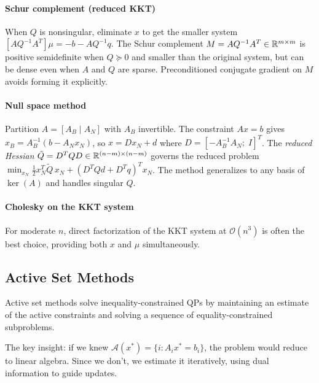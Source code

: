\paragraph{Schur complement (reduced KKT)}

When $Q$ is nonsingular, eliminate $x$ to get the smaller system $[AQ^{-1}A^T]\mu = -b - AQ^{-1}q$.
The Schur complement $M = AQ^{-1}A^T \in \mathbb{R}^{m \times m}$ is positive semidefinite when $Q \succeq 0$ and smaller than the original system, but can be dense even when $A$ and $Q$ are sparse.
Preconditioned conjugate gradient on $M$ avoids forming it explicitly.

\paragraph{Null space method}

Partition $A = [A_B \mid A_N]$ with $A_B$ invertible.
The constraint $Ax = b$ gives $x_B = A_B^{-1}(b - A_N x_N)$, so $x = Dx_N + d$ where $D = [-A_B^{-1}A_N;\; I]^T$.
The \textit{reduced Hessian} $\tilde{Q} = D^T Q D \in \mathbb{R}^{(n-m) \times (n-m)}$ governs the reduced problem $\min_{x_N} \frac{1}{2} x_N^T \tilde{Q}\, x_N + (D^T Q d + D^T q)^T x_N$.
The method generalizes to any basis of $\ker(A)$ and handles singular $Q$.

\paragraph{Cholesky on the KKT system}

For moderate $n$, direct factorization of the KKT system at $\mathcal{O}(n^3)$ is often the best choice, providing both $x$ and $\mu$ simultaneously.


\subsection{Active Set Methods}\label{ssec:active-set}

Active set methods solve inequality-constrained QPs by maintaining an estimate of the active constraints and solving a sequence of equality-constrained subproblems.

The key insight: if we knew $\mathcal{A}(x^*) = \{i : A_i x^* = b_i\}$, the problem would reduce to linear algebra.
Since we don't, we estimate it iteratively, using dual information to guide updates.

